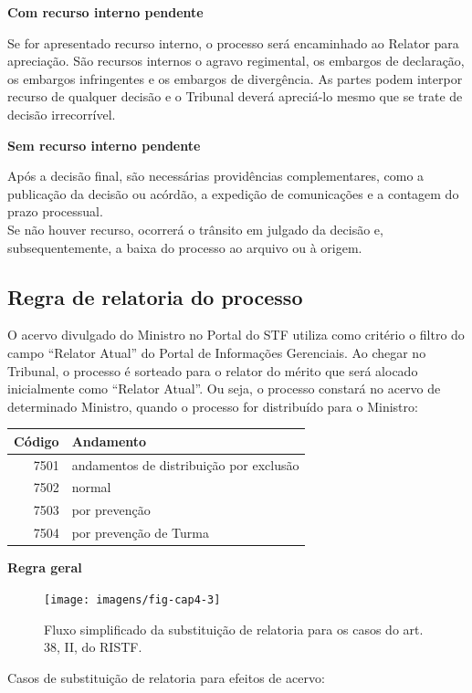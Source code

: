 \documentclass[
]{book}
\begin{document}
\textbf{Com recurso interno pendente}

Se for apresentado recurso interno, o processo será encaminhado ao Relator para apreciação.
São recursos internos o agravo regimental, os embargos de declaração, os embargos infringentes e os embargos de divergência.
As partes podem interpor recurso de qualquer decisão e o Tribunal deverá apreciá-lo mesmo que se trate de decisão irrecorrível.

\textbf{Sem recurso interno pendente}

Após a decisão final, são necessárias providências complementares, como a publicação da decisão ou acórdão, a expedição de comunicações e a contagem do prazo processual.\\
Se não houver recurso, ocorrerá o trânsito em julgado da decisão e, subsequentemente, a baixa do processo ao arquivo ou à origem.

\hypertarget{regra-de-relatoria-do-processo}{%
\subsection{Regra de relatoria do processo}\label{regra-de-relatoria-do-processo}}

O acervo divulgado do Ministro no Portal do STF utiliza como critério o filtro do campo ``Relator Atual'' do Portal de Informações Gerenciais. Ao chegar no Tribunal, o processo é sorteado para o relator do mérito que será alocado inicialmente como ``Relator Atual''.
Ou seja, o processo constará no acervo de determinado Ministro, quando o processo for distribuído para o Ministro:

\begin{tabular}{r|l}
\hline
Código & Andamento\\
\hline
7501 & andamentos de distribuição por exclusão\\
\hline
7502 & normal\\
\hline
7503 & por prevenção\\
\hline
7504 & por prevenção de Turma\\
\hline
\end{tabular}

\textbf{Regra geral}

\begin{figure}
\texttt{[image: imagens/fig-cap4-3]} \caption{Fluxo simplificado da substituição de relatoria para os casos do  art. 38, II, do RISTF.}\label{fig:unnamed-chunk-16}
\end{figure}

Casos de substituição de relatoria para efeitos de acervo:
\end{document}
